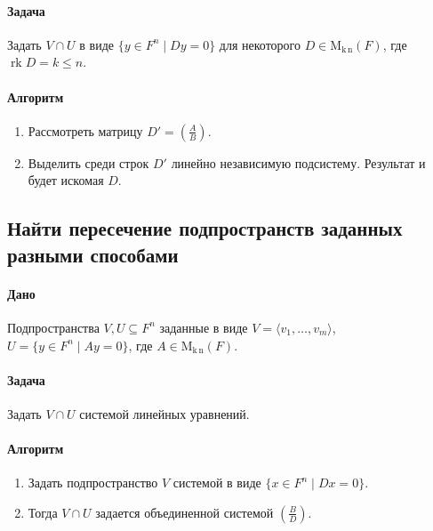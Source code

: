 \documentclass{article}
\newcommand{\MatrixDim}[3]{\operatorname{\mathrm{M}_{#2\,#3}}(#1)}
\newcommand{\rk}{\operatorname{rk}}
\begin{document}
\paragraph{Задача}

Задать $V\cap U$ в виде $\{y\in F^{n}\mid D y = 0\}$ для некоторого $D\in\MatrixDim{F}{k}{n}$, где $\rk D = k\leqslant n$.

\paragraph{Алгоритм}

\begin{enumerate}
\item Рассмотреть матрицу $D' = \left(\frac{A}{B}\right)$.

\item Выделить среди строк $D'$ линейно независимую подсистему.
Результат и будет искомая $D$.
\end{enumerate}


\subsection{Найти пересечение подпространств заданных разными способами}

\paragraph{Дано}

Подпространства $V,U\subseteq F^{n}$ заданные в виде $V =\langle v_1,\ldots,v_m\rangle$, $U = \{y\in F^{n}\mid Ay = 0\}$, где $A\in \MatrixDim{F}{k}{n}$.

\paragraph{Задача}

Задать $V \cap U$ системой линейных уравнений.

\paragraph{Алгоритм}
\begin{enumerate}
\item Задать подпространство $V$ системой в виде $\{x\in F^n \mid Dx = 0\}$.

\item Тогда $V\cap U$ задается объединенной системой $\left(\frac{B}{D}\right)$.
\end{enumerate}
\end{document}
